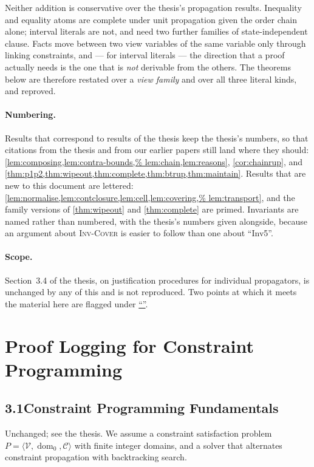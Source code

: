 \documentclass[11pt,a4paper]{article}
\theoremstyle{plain}
\theoremstyle{definition}
\theoremstyle{remark}
\newcommand{\fname}[1]{\ensuremath{\operatorname{#1}}}
\newcommand{\dm}{\fname{dom}}
\newcommand{\nsec}[1]{\hyperref[#1]{``\nameref*{#1}''}}
\begin{document}
Neither addition is conservative over the thesis's propagation results.
Inequality and equality atoms are complete under unit propagation given the
order chain alone; interval literals are not, and need two further families of
state-independent clause.  Facts move between two view variables of the same
variable only through linking constraints, and --- for interval literals --- the
direction that a proof actually needs is the one that is \emph{not} derivable
from the others.  The theorems below are therefore restated over a
\emph{view family} and over all three literal kinds, and reproved.

\paragraph{Numbering.}  Results that correspond to results of the thesis keep
the thesis's numbers, so that citations from the thesis and from our earlier
papers still land where they should: \cref{lem:composing,lem:contra-bounds,%
lem:chain,lem:reasons}, \cref{cor:chainrup}, and
\cref{thm:p1p2,thm:wipeout,thm:complete,thm:btrup,thm:maintain}.  Results that
are new to this document are lettered: \cref{lem:normalise,lem:contclosure,lem:cell,lem:covering,%
lem:transport}, and the family versions of \cref{thm:wipeout} and
\cref{thm:complete} are primed.  Invariants are named rather than numbered, with the
thesis's numbers given alongside, because an argument about \textsc{Inv-Cover}
is easier to follow than one about ``Inv5''.

\paragraph{Scope.}  Section~3.4 of the thesis, on justification procedures for
individual propagators, is unchanged by any of this and is not reproduced.  Two
points at which it meets the material here are flagged under
\nsec{sec:notprovided}.

\setcounter{section}{2}
\section{Proof Logging for Constraint Programming}

\subsection*{3.1\quad Constraint Programming Fundamentals}
\addtocounter{subsection}{1}

Unchanged; see the thesis.  We assume a constraint satisfaction problem
$P=\langle\mathcal V,\dm_0,\mathcal C\rangle$ with finite integer domains, and
a solver that alternates constraint propagation with backtracking search.
\end{document}
